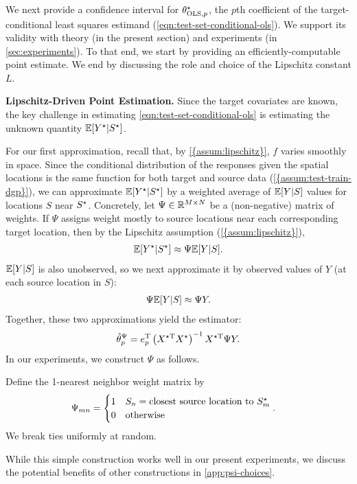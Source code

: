 We next provide a confidence interval for $\theta^{\star}_{\text{OLS},p}$, the $p$th coefficient of the target-conditional least squares estimand (\cref{eqn:test-set-conditional-ols}). We support its validity with theory (in the present section) and experiments (in \cref{sec:experiments}). To that end, we start by providing an efficiently-computable point estimate. We end by discussing the role and choice of the Lipschitz constant $L$.

\textbf{Lipschitz-Driven Point Estimation.} Since the target covariates are known, the key challenge in estimating \cref{eqn:test-set-conditional-ols} is estimating the unknown quantity $\mathbb{E}[Y^{\star} | S^{\star}]$.

For our first approximation, recall that, by \cref{{assum:lipschitz}}, $f$ varies smoothly in space. Since the conditional distribution of the responses given the spatial locations is the same function for both target and source data (\cref{{assum:test-train-dgp}}), we can approximate $\mathbb{E}[Y^{\star} | S^{\star}]$ by a weighted average of $\mathbb{E}[Y | S]$ values for locations $S$ near $S^{\star}$. Concretely, let $\Psi \in \mathbb{R}^{M \times N}$ be a (non-negative) matrix of weights. If $\Psi$ assigns weight mostly to source locations near each corresponding target location, then by the Lipschitz assumption (\cref{{assum:lipschitz}}), 
\begin{align}
\mathbb{E}[Y^{\star} | S^{\star}] \approx \Psi \mathbb{E}[Y | S].
\label{eqn:source_approx}
\end{align}
%
$\mathbb{E}[Y | S]$ is also unobserved, so we next approximate it by observed values of $Y$ (at each source location in $S$):
\begin{align}
\Psi \mathbb{E}[Y | S]  \approx \Psi Y.
\label{eqn:data_approx}
\end{align}
%
Together, these two approximations yield the estimator:
\begin{align}\label{eqn:psi-point-estimate-ols}
    \hat{\theta}_p^{\Psi} = e_p^{\mathrm{T}}\left(X^{\star\mathrm{T}} X^{\star} \right)^{-1}X^{\star\mathrm{T}} \Psi Y.
\end{align}
In our experiments, we construct $\Psi$ as follows. 
\begin{definition}\label{def:1nn-psi}
    Define the 1-nearest neighbor weight matrix by
    \begin{align}
        \Psi_{mn} & = \begin{cases}
            1 & S_n = \textrm{closest source location to } S^{\star}_m \\
            0 & \text{otherwise}
        \end{cases}
        .
    \end{align}
    We break ties uniformly at random. 
\end{definition}
While this simple construction works well in our present experiments, we discuss the potential benefits of other constructions in \cref{app:psi-choices}.

